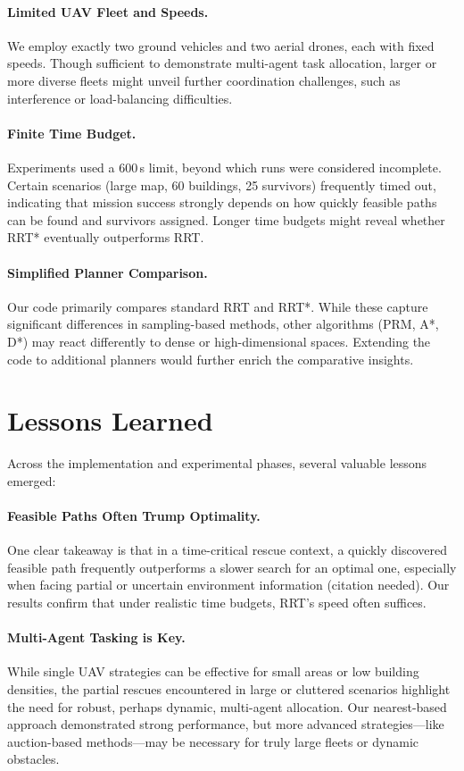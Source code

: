 \documentclass[12pt,a4paper]{report}
\begin{document}
\paragraph{Limited UAV Fleet and Speeds.}
We employ exactly two ground vehicles and two aerial drones, each with fixed speeds. 
Though sufficient to demonstrate multi-agent task allocation, larger or more diverse 
fleets might unveil further coordination challenges, such as interference or 
load-balancing difficulties.

\paragraph{Finite Time Budget.}
Experiments used a 600\,s limit, beyond which runs were considered incomplete. Certain 
scenarios (large map, 60 buildings, 25 survivors) frequently timed out, indicating 
that mission success strongly depends on how quickly feasible paths can be found and 
survivors assigned. Longer time budgets might reveal whether RRT* eventually outperforms RRT.

\paragraph{Simplified Planner Comparison.}
Our code primarily compares standard RRT and RRT*. While these capture significant 
differences in sampling-based methods, other algorithms (PRM, A*, D*) may react 
differently to dense or high-dimensional spaces. Extending the code to additional 
planners would further enrich the comparative insights.

\section{Lessons Learned}
\label{sec:lessons_learned}
Across the implementation and experimental phases, several valuable lessons emerged:

\paragraph{Feasible Paths Often Trump Optimality.}
One clear takeaway is that in a time-critical rescue context, a quickly discovered 
feasible path frequently outperforms a slower search for an optimal one, especially 
when facing partial or uncertain environment information (citation needed). Our 
results confirm that under realistic time budgets, RRT's speed often suffices.

\paragraph{Multi-Agent Tasking is Key.}
While single UAV strategies can be effective for small areas or low building densities, 
the partial rescues encountered in large or cluttered scenarios highlight the need 
for robust, perhaps dynamic, multi-agent allocation. Our nearest-based approach 
demonstrated strong performance, but more advanced strategies—like auction-based 
methods—may be necessary for truly large fleets or dynamic obstacles.
\end{document}
